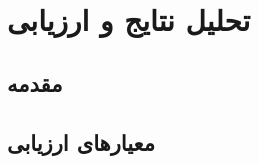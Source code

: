 \chapter{تحلیل نتایج و ارزیابی}\label{Chap:Chap4}
\minitoc
\section{مقدمه}
\section{معیارهای ارزیابی}